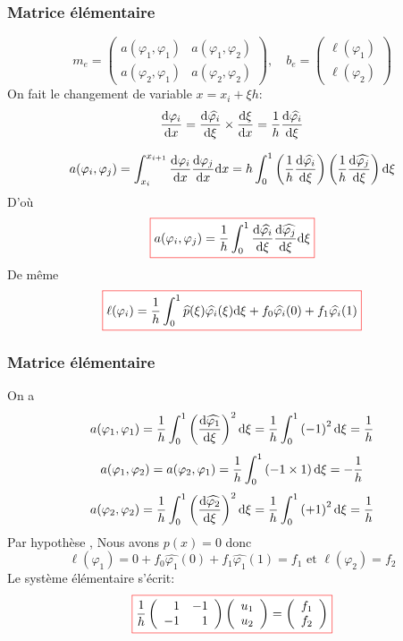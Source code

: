 \documentclass{beamer}
\def \de {{\rm d}}
\newcommand{\myredbox}[1]{\fcolorbox{red}{white}{$\displaystyle#1$}}
\begin{document}
\begin{frame}
\frametitle{Matrice élémentaire}
\[m_e=\left(\begin{array}{cc}
a(\varphi_1,\varphi_1) & a(\varphi_1,\varphi_2) \\
a(\varphi_2,\varphi_1) & a(\varphi_2,\varphi_2) 
\end{array}\right),\quad b_e=\left(\begin{array}{c}
\ell(\varphi_1) \\
\ell(\varphi_2) 
\end{array}\right)\]
On fait le changement de variable $x=x_i+\xi h$: 
\[\frac{\de \varphi_i}{\de x}=\frac{\de \widehat{\varphi_i}}{\de \xi}\times \frac{\de \xi}{\de x}=\frac 1h\frac{\de \widehat{\varphi_i}}{\de \xi}\]

\[a(\varphi_i,\varphi_j)=\int_{x_i}^{x_{i+1}}\frac{\de \varphi_i}{\de x} \frac{\de \varphi_j}{\de x}\de x
=h \int_{0}^{1}\left(\frac 1h \frac{\de \widehat{\varphi_i}}{\de \xi}\right)\left(\frac 1h \frac{\de \widehat{\varphi_j}}{\de \xi}\right)\de \xi
\]
D'où
\[\myredbox{a(\varphi_i,\varphi_j)=\frac 1h  \int_{0}^{1}\frac{\de \widehat{\varphi_i}}{\de \xi} \frac{\de \widehat{\varphi_j}}{\de \xi}\de \xi }
\]
De même
\[\myredbox{\ell(\varphi_i)=\frac 1h  \int_{0}^{1} \widehat{p}(\xi) \widehat{\varphi_i}(\xi) \de \xi +f_0\widehat{\varphi_i} (0)+f_1\widehat{\varphi_i} (1)}\]

\end{frame}

\begin{frame}
\frametitle{Matrice élémentaire}
On a
\[a(\varphi_1,\varphi_1)=\frac 1h  \int_{0}^{1}\left(\frac{\de \widehat{\varphi_1}}{\de \xi}\right)^2\de \xi=\frac 1h  \int_{0}^{1}\left(-1\right)^2\de \xi =\frac 1h 
\]
\[a(\varphi_1,\varphi_2)=a(\varphi_2,\varphi_1)=\frac 1h  \int_{0}^{1}\left(-1\times 1\right)\de \xi =-\frac 1h\]
\[a(\varphi_2,\varphi_2)=\frac 1h  \int_{0}^{1}\left(\frac{\de \widehat{\varphi_2}}{\de \xi}\right)^2\de \xi=\frac 1h  \int_{0}^{1}\left(+1\right)^2\de \xi =\frac 1h 
\]Par hypothèse , Nous avons $p(x)=0$ donc
\[\ell(\varphi_1)=0 +f_0\widehat{\varphi_1} (0)+f_1\widehat{\varphi_1} (1)=f_1 \mbox{ et } \ell(\varphi_2)=f_2\]
Le système élémentaire s'écrit:
\[\myredbox{\frac{1}{h}\left(\begin{array}{rr} 
1&-1\\-1&1
\end{array}\right) \left(\begin{array}{l} 
u_{1}\\u_{2}
\end{array}\right)=\left(\begin{array}{r} 
f_{1}\\f_{2}
\end{array}\right)}
\]

\end{frame}
\end{document}
